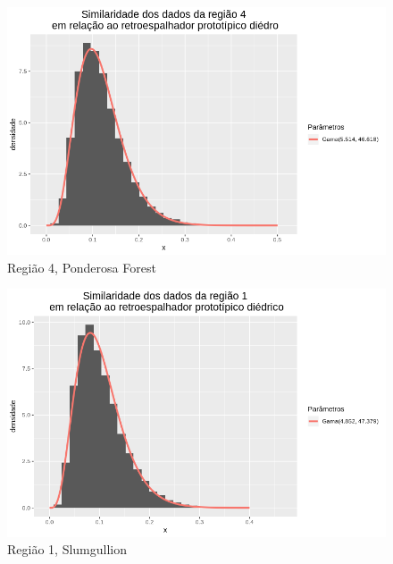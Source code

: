 \documentclass[12pt]{article}
\begin{document}
\begin{figure}[!h]
    \centering
    \vspace{0.1\linewidth}
    \includegraphics[width = \linewidth]{../../Images/Report_18_12_20/ponder_di_region4.png}
    \caption{Região 4, Ponderosa Forest}
    \label{fig:pond_di_r4}
\end{figure}

\begin{figure}[!h]
    \centering
    \vspace{0.1\linewidth}
    \includegraphics[width = \linewidth]{../../Images/Report_18_12_20/slum_di_region1.png}
    \caption{Região 1, Slumgullion}
    \label{fig:slum_di_r1}
\end{figure}
\end{document}
